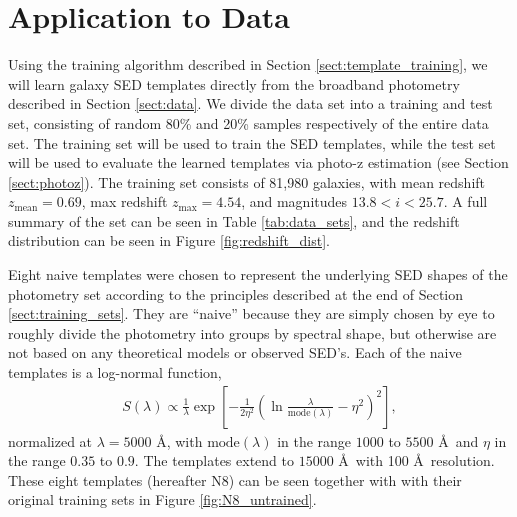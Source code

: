\documentclass[twocolumn]{aastex63}
\begin{document}
\section{Application to Data}

    \label{sect:application}

    Using the training algorithm described in Section \ref{sect:template_training}, we will learn galaxy SED templates directly from the broadband photometry described in Section \ref{sect:data}.
    We divide the data set into a training and test set, consisting of random 80\% and 20\% samples respectively of the entire data set.
    The training set will be used to train the SED templates, while the test set will be used to evaluate the learned templates via photo-z estimation (see Section \ref{sect:photoz}).
    The training set consists of 81,980 galaxies, with mean redshift $z_\text{mean} = 0.69$, max redshift $z_\text{max} = 4.54$, and magnitudes $13.8 < i < 25.7$.
    A full summary of the set can be seen in Table \ref{tab:data_sets}, and the redshift distribution can be seen in Figure \ref{fig:redshift_dist}.

    Eight naive templates were chosen to represent the underlying SED shapes of the photometry set according to the principles described at the end of Section \ref{sect:training_sets}.
    They are ``naive'' because they are simply chosen by eye to roughly divide the photometry into groups by spectral shape, but otherwise are not based on any theoretical models or observed SED's.
    Each of the naive templates is a log-normal function,
    \begin{align}
        S(\lambda) \propto \frac{1}{\lambda} \exp{\left[ -\frac{1}{2\eta^2} \left( \ln{\frac{\lambda}{\text{mode}(\lambda)}}-\eta^2 \right)^2 \right]},
    \end{align}
    normalized at $\lambda = 5000$ \AA, with $\text{mode}(\lambda)$ in the range $1000$ to $5500$ \AA\  and $\eta$ in the range $0.35$ to $0.9$. 
    The templates extend to $15000$ \AA\ with 100 \AA\ resolution.
    These eight templates (hereafter N8) can be seen together with with their original training sets in Figure \ref{fig:N8_untrained}.
\end{document}
